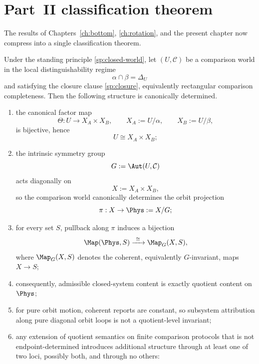 \section{Part~II classification theorem}
\label{sec:partII-classification}
The results of Chapters~\ref{ch:bottom}, \ref{ch:rotation}, and the
present chapter now compress into a single classification theorem.
\begin{theorem}
	\label{thm:structural-closure}
	Under the standing principle \cref{sp:closed-world}, let
	\((U,\mathcal C)\) be a comparison world in the local
	distinguishability regime
	\[
		\alpha\cap\beta=\Delta_U
	\]
	and satisfying the closure clause \cref{sp:closure}, equivalently
	rectangular comparison completeness.
	Then the following structure is canonically determined.
	\begin{enumerate}[label=\textup{(\roman*)}]
		\item
		      the canonical factor map
		      \[
			      \Theta:U\to X_A\times X_B,
			      \qquad
			      X_A:=U/\alpha,
			      \qquad
			      X_B:=U/\beta,
		      \]
		      is bijective, hence
		      \[
			      U\cong X_A\times X_B;
		      \]
		\item
		      the intrinsic symmetry group
		      \[
			      G:=\Aut(U,\mathcal C)
		      \]
		      acts diagonally on
		      \[
			      X:=X_A\times X_B,
		      \]
		      so the comparison world canonically determines the orbit projection
		      \[
			      \pi:X\to\Phys:=X/G;
		      \]
		\item
		      for every set \(S\), pullback along \(\pi\) induces a bijection
		      \[
			      \Map(\Phys,S)\xrightarrow{\ \cong\ }\Map_G(X,S),
		      \]
		      where \(\Map_G(X,S)\) denotes the coherent, equivalently \(G\)-invariant,
		      maps \(X\to S\);
		\item
		      consequently, admissible closed-system content is exactly quotient
		      content on \(\Phys\);
		\item
		      for pure orbit motion, coherent reports are constant, so subsystem
		      attribution along pure diagonal orbit loops is not a quotient-level
		      invariant;
		\item
		      any extension of quotient semantics on finite comparison protocols that
		      is not endpoint-determined introduces additional structure through at
		      least one of two loci, possibly both, and through no others:
		      \begin{enumerate}[label=\textup{(\alph*)}]

\end{enumerate}
\end{enumerate}
\end{theorem}
